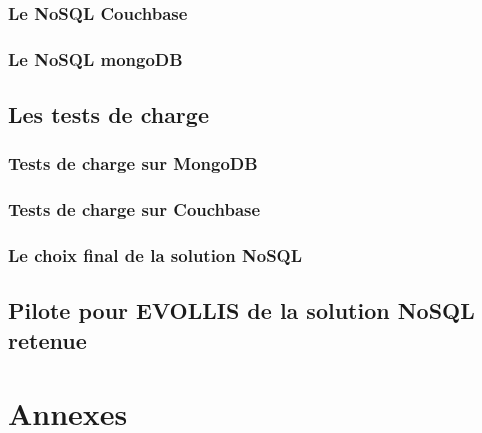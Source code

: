                 \section{Le \textsf{NoSQL Couchbase}}\label{couchbase}
                

                \section{Le \textsf{NoSQL mongoDB}}\label{mongodb}
                



      \chapter{Les tests de charge}

                \section{Tests de charge sur \textsf{MongoDB}}

                \section{Tests de charge sur \textsf{Couchbase}}
     
                \section{Le choix final de la solution \textsf{NoSQL}}

      \chapter{Pilote pour \textsf{EVOLLIS} de la solution \textsf{NoSQL} retenue}

      

\printindex

\nocite{cassandra2}
\nocite{cassandra}
\nocite{NoSQLCmp}
\nocite{NoSQLeurope}
\nocite{NoSQLvsSQL}



\part{Annexes}
\appendix




